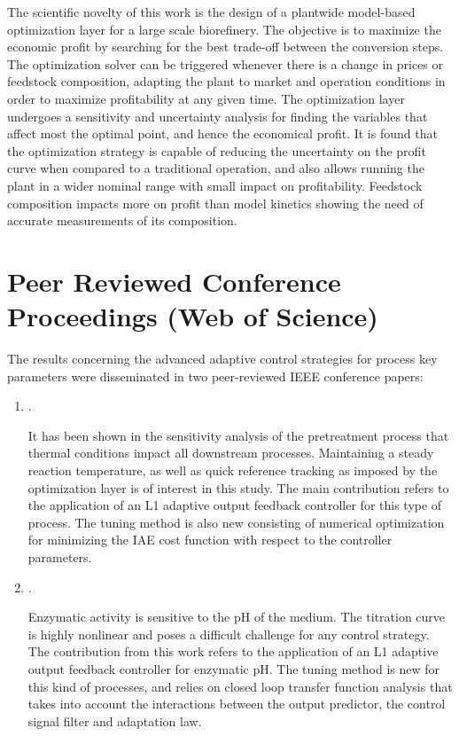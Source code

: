\begin{enumerate}[label=(\Alph*)]
	The scientific novelty of this work is the design of a plantwide model-based optimization layer for a large scale biorefinery. The objective is to maximize the economic profit by searching for the best trade-off between the conversion steps. The optimization solver can be triggered whenever there is a change in prices or feedstock composition, adapting the plant to market and operation conditions in order to maximize profitability at any given time. The optimization layer undergoes a sensitivity and uncertainty analysis for finding the variables that affect most the optimal point, and hence the economical profit. It is found that the optimization strategy is capable of reducing the uncertainty on the profit curve when compared to a traditional operation, and also allows running the plant in a wider nominal range with small impact on profitability. Feedstock composition impacts more on profit than model kinetics showing the need of accurate measurements of its composition.
\end{enumerate}

\section*{Peer Reviewed Conference Proceedings (Web of Science)}
The results concerning the advanced adaptive control strategies for process key parameters were disseminated in two peer-reviewed IEEE conference papers:

\begin{enumerate}[label=(\Alph*), resume]
	\item {}.
	
	It has been shown in the sensitivity analysis of the pretreatment process that thermal conditions impact all downstream processes. Maintaining a steady reaction temperature, as well as quick reference tracking as imposed by the optimization layer is of interest in this study. The main contribution refers to the application of an L1 adaptive output feedback controller for this type of process. The tuning method is also new consisting of numerical optimization for minimizing the \gls{IAE} cost function with respect to the controller parameters.
	
	\item {}.
	
	Enzymatic activity is sensitive to the pH of the medium. The titration curve is highly nonlinear and poses a difficult challenge for any control strategy. The contribution from this work refers to the application of an L1 adaptive output feedback controller for enzymatic pH. The tuning method is new for this kind of processes, and relies on closed loop transfer function analysis that takes into account the interactions between the output predictor, the control signal filter and adaptation law.
\end{enumerate}

